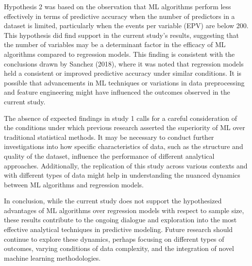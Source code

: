\documentclass[
  man]{apa7}
\begin{document}
Hypothesis 2 was based on the observation that ML algorithms perform less effectively in terms of predictive accuracy when the number of predictors in a dataset is limited, particularly when the events per variable (EPV) are below 200. This hypothesis did find support in the current study's results, suggesting that the number of variables may be a determinant factor in the efficacy of ML algorithms compared to regression models. This finding is consistent with the conclusions drawn by Sanchez (2018), where it was noted that regression models held a consistent or improved predictive accuracy under similar conditions. It is possible that advancements in ML techniques or variations in data preprocessing and feature engineering might have influenced the outcomes observed in the current study.

The absence of expected findings in study 1 calls for a careful consideration of the conditions under which previous research asserted the superiority of ML over traditional statistical methods. It may be necessary to conduct further investigations into how specific characteristics of data, such as the structure and quality of the dataset, influence the performance of different analytical approaches. Additionally, the replication of this study across various contexts and with different types of data might help in understanding the nuanced dynamics between ML algorithms and regression models.

In conclusion, while the current study does not support the hypothesized advantages of ML algorithms over regression models with respect to sample size, these results contribute to the ongoing dialogue and exploration into the most effective analytical techniques in predictive modeling. Future research should continue to explore these dynamics, perhaps focusing on different types of outcomes, varying conditions of data complexity, and the integration of novel machine learning methodologies.
\end{document}
